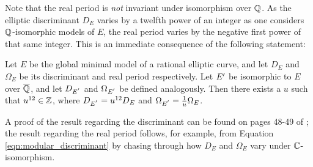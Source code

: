 Note that the real period is {\it not} invariant under isomorphism over $\mathbb{Q}$. As the elliptic discriminant $D_E$ varies by a twelfth power of an integer as one considers $\mathbb{Q}$-isomorphic models of $E$, the real period varies by the negative first power of that same integer. This is an immediate consequence of the following statement:
\begin{lemma}
Let $E$ be the global minimal model of a rational elliptic curve, and let $D_E$ and $\Omega_E$ be its discriminant and real period respectively. Let $E^{\prime}$ be isomorphic to $E$ over $\overline{\mathbb{Q}}$, and let $D_{E^{^{\prime}}}$ and $\Omega_{E^{^{\prime}}}$ be defined analogously. Then there exists a $u$ such that  $u^{12}\in \mathbb{Z}$, where $D_{E^{^{\prime}}}=u^{12} D_E$ and $\Omega_{E^{^{\prime}}}=\frac{1}{u}\Omega_E$.
\end{lemma}
A proof of the result regarding the discriminant can be found on pages 48-49 of \cite{Sil-1985}; the result regarding the real period follows, for example, from Equation \ref{eqn:modular_discriminant} by chasing through how $D_E$ and $\Omega_E$ vary under $\mathbb{C}$-isomorphism. \\

